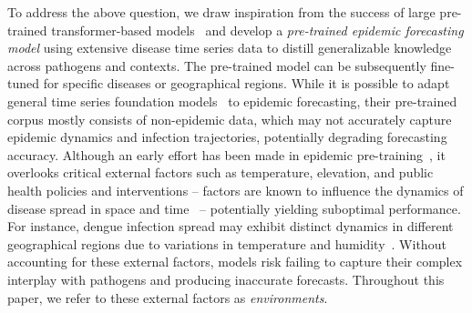 



To address the above question, we draw inspiration from the success of large pre-trained transformer-based models~\cite{zhao2023survey} and develop a \textit{pre-trained epidemic forecasting model} using extensive disease time series data to distill generalizable knowledge across pathogens and contexts. 
The pre-trained model can be subsequently fine-tuned for specific diseases or geographical regions. While it is possible to adapt general time series foundation models~\cite{liang2024foundation, ma2024survey} to epidemic forecasting, their pre-trained corpus mostly consists of non-epidemic data, which may not accurately capture epidemic dynamics and infection trajectories, potentially degrading forecasting accuracy. Although an early effort has been made in epidemic pre-training~\cite{kamarthi2023pems}, it overlooks critical external factors such as temperature, elevation, and public health policies and interventions – factors are known to influence the dynamics of disease spread in space and time~\cite{lau2020characterizing} – potentially yielding suboptimal performance.
For instance, dengue infection spread may exhibit distinct dynamics in different geographical regions due to variations in temperature and humidity~\cite{chen2012modeling}. Without accounting for these external factors, models risk failing to capture their complex interplay with pathogens and producing inaccurate forecasts.
Throughout this paper, we refer to these external factors as \textit{environments}.


